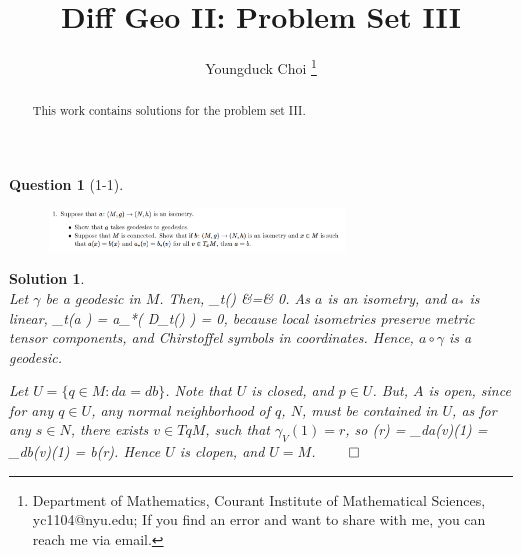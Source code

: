 \documentclass[11pt]{article}
\date{}
\title{\vspace{-0.7cm}
Diff Geo II: Problem Set III}
\author{
Youngduck Choi 
\thanks{Department of Mathematics, Courant Institute of Mathematical Sciences, 
yc1104@nyu.edu; If you find an error and want to share with me, 
you can reach me via email.
}}
\theoremstyle{plain}
\def\eQb#1\eQe{\begin{eqnarray*}#1\end{eqnarray*}}
\theoremstyle{quest}
\newtheorem*{question}{Question}
\newtheorem*{solution}{Solution}
\begin{document}
\maketitle

\begin{abstract}
This work contains solutions for the problem set III.
\end{abstract}


\begin{question}[1-1]
\hfill
\begin{figure}[h!]
  \centering
    \includegraphics[width=0.7\textwidth]{dg-s3-p1.png}
\end{figure}
\end{question}
\begin{solution} \hfill \\
Let $\gamma$ be a geodesic in $M$. Then,
\eQb
D_{t(\gamma)} \dot{\gamma} &=& 0.
\eQe
As $a$ is an isometry, and $a_*$ is linear,
\eQb
D_{t(a \circ \gamma)}  = a_*( D_{t(\gamma)} \dot{\gamma}) = 0, 
\eQe
because local isometries preserve metric tensor components, and Chirstoffel symbols 
in coordinates. Hence, $a \circ \gamma$ is a geodesic. 

\bigskip

\noindent Let $U = \{q \in M : da = db\}$. Note that $U$ is closed, and $p \in U$. But,
$A$ is open, since for any $q \in U$, any normal neighborhood of $q$, $N$, must be
contained in $U$, as for any $s \in N$, there exists $v \in TqM$, such that
$\gamma_{V}(1) = r$, so
\eQb
a(r) = \gamma_{da(v)}(1) = \gamma_{db(v)}(1) = b(r).
\eQe
Hence $U$ is clopen, and $U = M$. \hfill $\qed$ 


\end{solution}

\newpage
\end{document}
